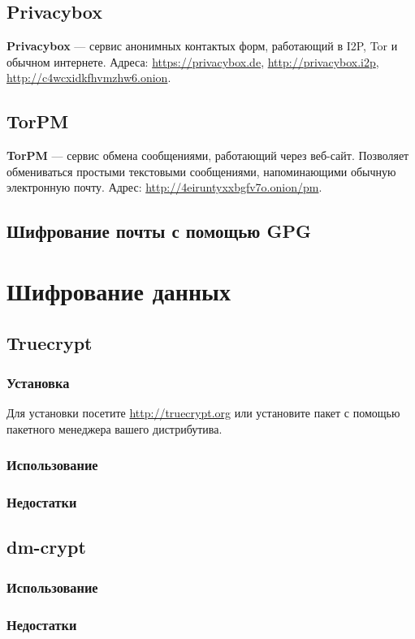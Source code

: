 \subsection{Privacybox}
\textbf{Privacybox} --- сервис анонимных контактых форм, работающий в I2P, Tor и обычном интернете. Адреса: \url{https://privacybox.de}, \url{http://privacybox.i2p}, \url{http://c4wcxidkfhvmzhw6.onion}.
\subsection{TorPM}
\textbf{TorPM} --- сервис обмена сообщениями, работающий через веб-сайт. Позволяет обмениваться простыми текстовыми сообщениями, напоминающими обычную электронную почту. Адрес: \url{http://4eiruntyxxbgfv7o.onion/pm}.
\subsection{Шифрование почты с помощью GPG}

\section{Шифрование данных}
\subsection{Truecrypt}
\subsubsection{Установка}
Для установки посетите \url{http://truecrypt.org} или установите пакет с помощью пакетного менеджера вашего дистрибутива.
\subsubsection{Использование}
\subsubsection{Недостатки}
\subsection{dm-crypt}
\subsubsection{Использование}
\subsubsection{Недостатки}
